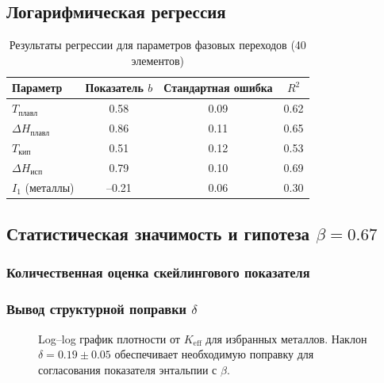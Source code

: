 \documentclass[12pt,a4paper]{article}
\theoremstyle{remark}
\newcommand{\Keff}{K_{\mathrm{eff}}}
\begin{document}
	\subsection{Логарифмическая регрессия}
	\begin{table}[htbp]
		\centering
		\caption{Результаты регрессии для параметров фазовых переходов (40 элементов)}
		\label{tab:regression}
		\begin{tabular}{@{}lccc@{}}
			\toprule
			\textbf{Параметр} & \textbf{Показатель }\(b\) & \textbf{Стандартная ошибка} & \textbf{\(R^2\)} \\
			\midrule
			\(T_{\text{плавл}}\)   & 0.58 & 0.09 & 0.62 \\
			\(\Delta H_{\text{плавл}}\) & 0.86 & 0.11 & 0.65 \\
			\(T_{\text{кип}}\)   & 0.51 & 0.12 & 0.53 \\
			\(\Delta H_{\text{исп}}\) & 0.79 & 0.10 & 0.69 \\
			\(I_1\) (металлы)      & --0.21 & 0.06 & 0.30 \\
			\bottomrule
		\end{tabular}
	\end{table}
	
	\subsection{Статистическая значимость и гипотеза \(\beta = 0.67\)}
	\subsubsection{Количественная оценка скейлингового показателя}
	\subsubsection{Вывод структурной поправки \(\delta\)}
	
	\begin{figure}[htbp]
		\centering
		\caption{Log–log график плотности от \(\Keff\) для избранных металлов. Наклон \(\delta = 0.19 \pm 0.05\) обеспечивает необходимую поправку для согласования показателя энтальпии с \(\beta\).}
		\label{fig:density_scaling}
	\end{figure}
	
\end{document}
